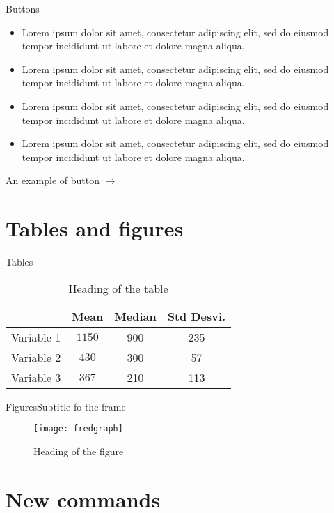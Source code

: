 \documentclass[10pt,numbering,toc]{bpslides}
\begin{document}
\begin{frame}{Buttons}
    \vfill
	\begin{itemize}
	\item Lorem ipsum dolor sit amet, consectetur adipiscing elit, sed do eiusmod tempor incididunt ut labore et dolore magna aliqua.
	\item Lorem ipsum dolor sit amet, consectetur adipiscing elit, sed do eiusmod tempor incididunt ut labore et dolore magna aliqua.
	\item Lorem ipsum dolor sit amet, consectetur adipiscing elit, sed do eiusmod tempor incididunt ut labore et dolore magna aliqua.
	\item Lorem ipsum dolor sit amet, consectetur adipiscing elit, sed do eiusmod tempor incididunt ut labore et dolore magna aliqua.
	\end{itemize}
	\vfill
	\hfill An example of button $\to$ 
\end{frame}

\section{Tables and figures}

\begin{frame}{Tables}
    \begin{table}
    \centering
    \caption{Heading of the table}
    \begin{tabular}{cccc} \toprule
        & Mean & Median & Std Desvi.\\ \midrule
        Variable 1 & $1150$ & 900 & 235 \\ 
        Variable 2 & $430$ & 300 & 57 \\ 
        Variable 3 & $367$ & 210 & 113 \\ \bottomrule
    \end{tabular}
    \end{table}
\end{frame}

\begin{frame}{Figures}{Subtitle fo the frame}
    \begin{figure}
    \centering
    \caption{Heading of the figure}
    \texttt{[image: fredgraph]}
    \end{figure}
\end{frame}

\section{New commands}
\end{document}
